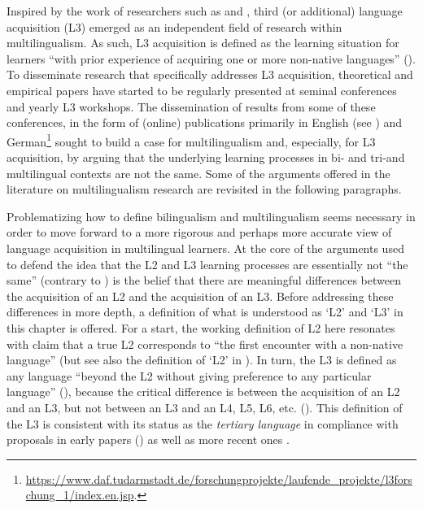 \documentclass[output=paper,colorlinks,citecolor=brown,nonflat]{../langscibook}
\begin{document}
 Inspired by the work of researchers such as \citet{Hufeisen1998, Hufeisen2003} and \citet{DeAngelis2007}, third (or additional) language acquisition (L3) emerged as an independent field of research within multilingualism. As such, L3 acquisition is defined as the learning situation for learners “with prior experience of acquiring one or more non-native languages” (\citealt[128]{Hammarberg2018}). To disseminate research that specifically addresses L3 acquisition, theoretical and empirical papers have started to be regularly presented at seminal conferences and yearly L3 workshops. The dissemination of results from some of these conferences, in the form of (online) publications primarily in English (see \citealt{CenozEtAl2001}) and German\footnote{\url{https://www.daf.tudarmstadt.de/forschungprojekte/laufende_projekte/l3forschung_1/index.en.jsp}{.}} sought to build a case for multilingualism and, especially, for L3 acquisition, by arguing that the underlying learning processes in bi- and tri-and multilingual contexts are not the same. Some of the arguments offered in the literature on multilingualism research are revisited in the following paragraphs.

Problematizing how to define bilingualism and multilingualism seems necessary in order to move forward to a more rigorous and perhaps more accurate view of language acquisition in multilingual learners. At the core of the arguments used to defend the idea that the L2 and L3 learning processes are essentially not “the same” (contrary to \citealt{MitchellMyles1998}) is the belief that there are meaningful differences between the acquisition of an L2 and the acquisition of an L3. Before addressing these differences in more depth, a definition of what is understood as ‘L2’ and ‘L3’ in this chapter is offered. For a start, the working definition of L2 here resonates with  claim that a true L2 corresponds to “the first encounter with a non-native language” (but see also the definition of ‘L2’ in ). In turn, the L3 is defined as any language “beyond the L2 without giving preference to any particular language” (\citealt[11]{DeAngelis2007}), because the critical difference is between the acquisition of an L2 and an L3, but not between an L3 and an L4, L5, L6, etc. (\citealt{Hammarberg2001, Hufeisen2003, DeAngelis2007}). This definition of the L3 is consistent with its status as the \textit{tertiary language} in compliance with proposals in early papers (\citealt{LindemannHufeisen1998, DentlerEtAl2000}) as well as more recent ones \citep{Hammarberg2018}.
\end{document}
